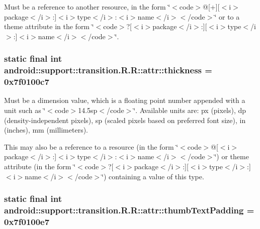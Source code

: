 Must be a reference to another resource, in the form \char`\"{}$<$code$>$@\mbox{[}+\mbox{]}\mbox{[}$<$i$>$package$<$/i$>$:\mbox{]}$<$i$>$type$<$/i$>$:$<$i$>$name$<$/i$>$$<$/code$>$\char`\"{} or to a theme attribute in the form \char`\"{}$<$code$>$?\mbox{[}$<$i$>$package$<$/i$>$:\mbox{]}\mbox{[}$<$i$>$type$<$/i$>$:\mbox{]}$<$i$>$name$<$/i$>$$<$/code$>$\char`\"{}. \hypertarget{classandroid_1_1support_1_1transition_1_1_r_1_1attr_96eac79af0f71cc5f50ddf75acdab3eb}{
\subsubsection[{thickness}]{\setlength{\rightskip}{0pt plus 5cm}static final int android::support::transition.R.R::attr::thickness = 0x7f0100c7}}
\label{classandroid_1_1support_1_1transition_1_1_r_1_1attr_96eac79af0f71cc5f50ddf75acdab3eb}


Must be a dimension value, which is a floating point number appended with a unit such as \char`\"{}$<$code$>$14.5sp$<$/code$>$\char`\"{}. Available units are: px (pixels), dp (density-independent pixels), sp (scaled pixels based on preferred font size), in (inches), mm (millimeters). 

This may also be a reference to a resource (in the form \char`\"{}$<$code$>$@\mbox{[}$<$i$>$package$<$/i$>$:\mbox{]}$<$i$>$type$<$/i$>$:$<$i$>$name$<$/i$>$$<$/code$>$\char`\"{}) or theme attribute (in the form \char`\"{}$<$code$>$?\mbox{[}$<$i$>$package$<$/i$>$:\mbox{]}\mbox{[}$<$i$>$type$<$/i$>$:\mbox{]}$<$i$>$name$<$/i$>$$<$/code$>$\char`\"{}) containing a value of this type. \hypertarget{classandroid_1_1support_1_1transition_1_1_r_1_1attr_0c3e4c017a864f53f824bfedfe23e634}{
\subsubsection[{thumbTextPadding}]{\setlength{\rightskip}{0pt plus 5cm}static final int android::support::transition.R.R::attr::thumbTextPadding = 0x7f0100e7}}
\label{classandroid_1_1support_1_1transition_1_1_r_1_1attr_0c3e4c017a864f53f824bfedfe23e634}


